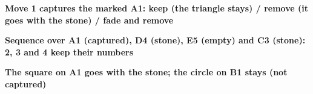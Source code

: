 \documentclass{article}
\newcommand\case[1]{\par\medskip\noindent\textbf{#1}\par\nopagebreak}
\begin{document}
\case{Move 1 captures the marked A1: keep (the triangle stays) / remove (it goes with the stone) / fade and remove}
\begin{goban}[5, captures]
\end{goban}
\begin{goban}[5, captures, captured marks = remove]
\end{goban}
\begin{goban}[5, captures = fade, captured marks = remove]
\end{goban}

\case{Sequence over A1 (captured), D4 (stone), E5 (empty) and C3 (stone): 2, 3 and 4 keep their numbers}
\begin{goban}[5, captures, captured marks = remove]
\end{goban}

\case{The square on A1 goes with the stone; the circle on B1 stays (not captured)}
\begin{goban}[5, captures, captured marks = remove]
\end{goban}
\end{document}
